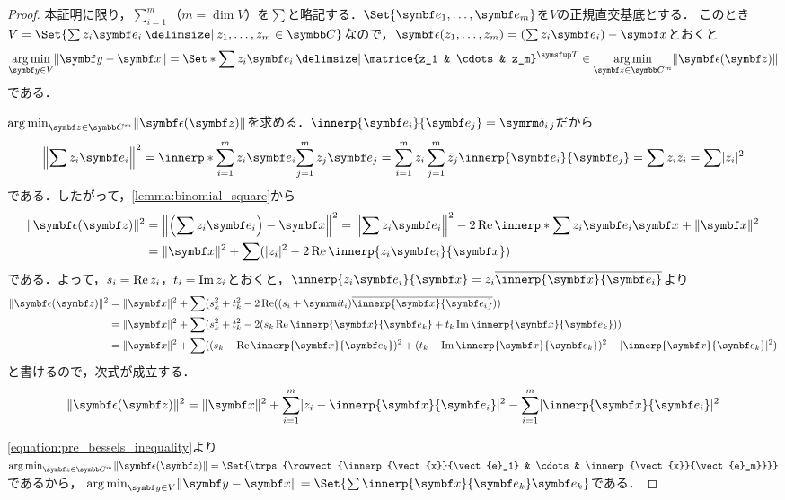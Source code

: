 \documentclass[../../main]{subfiles}
\begin{document}
\begin{proof}
  本証明に限り，\(\sum_{i=1}^m\)（\(m=\dim V\)）を\(\sum\)と略記する．\(\Set{\vect{e}_1,\dots,\vect{e}_m}\)を\(V\)の正規直交基底とする．
  このとき\(V=\Set{\sum z_i\vect{e}_i\given z_1,\dots,z_m\in\numset{C}}\)なので，\(\vect{\epsilon}(z_1,\dots,z_m)=(\sum z_i\vect{e}_i)-\vect{x}\)とおくと
  \[
    \argmin_{\vect{y}\in V}\vnorm{\vect{y}-\vect{x}} = \Set*{\sum z_i\vect{e}_i\given\trps{\matrice{z_1 & \cdots & z_m}}\in\argmin_{\vect{z}\in\numset{C}^m}\vnorm{\vect{\epsilon}(\vect{z})}}
  \]
  である．

  \(\argmin_{\vect{z}\in\numset{C}^m}\vnorm{\vect{\epsilon}(\vect{z})}\)を求める．\(\innerp{\vect{e}_i}{\vect{e}_j}=\kdelta{i}{j}\)だから
  \[
    \vnorm*{\sum z_i\vect{e}_i}^2 = \innerp*{\sum_{i=1}^mz_i\vect{e}_i}{\sum_{j=1}^mz_j\vect{e}_j}
    = \sum_{i=1}^mz_i\sum_{j=1}^m\conj{z}_j\innerp{\vect{e}_i}{\vect{e}_j}
    = \sum z_i\conj{z}_i
    = \sum\abs{z_i}^2
  \]
  である．したがって，\cref{lemma:binomial_square}から
  \begin{align*}
    \vnorm{\vect{\epsilon}(\vect{z})}^2 &= \vnorm*{\pqty*{\sum z_i\vect{e}_i}-\vect{x}}^2
    = \vnorm*{\sum z_i\vect{e}_i}^2-2\rpart\innerp*{\sum z_i\vect{e}_i}{\vect{x}}+\vnorm{\vect{x}}^2 \\
    &= \vnorm{\vect{x}}^2+\sum(\abs{z_i}^2-2\rpart\innerp{z_i\vect{e}_i}{\vect{x}})
  \end{align*}
  である．よって，\(s_i=\operatorname{Re} z_i\)，\(t_i=\operatorname{Im} z_i\)とおくと，\(\innerp{z_i\vect{e}_i}{\vect{x}}=z_i\conj*{\innerp{\vect{x}}{\vect{e}_i}}\)より
  \begin{align*}
    \vnorm{\vect{\epsilon}(\vect{z})}^2 &= \vnorm{\vect{x}}^2+\sum(s_k^2+t_k^2-2\rpart((s_i+\iuni t_i)\conj*{\innerp{\vect{x}}{\vect{e}_i}})) \\
    &= \vnorm{\vect{x}}^2+\sum(s_k^2+t_k^2-2(s_k\rpart\innerp{\vect{x}}{\vect{e}_k}+t_k\ipart\innerp{\vect{x}}{\vect{e}_k})) \\
    &= \vnorm{\vect{x}}^2+\sum((s_k-\rpart\innerp{\vect{x}}{\vect{e}_k})^2+(t_k-\ipart\innerp{\vect{x}}{\vect{e}_k})^2-\abs{\innerp{\vect{x}}{\vect{e}_k}}^2)
  \end{align*}
  と書けるので，次式が成立する．
  \begin{equation}
    \label{equation:pre_bessels_inequality}
    \vnorm{\vect{\epsilon}(\vect{z})}^2 = \vnorm{\vect{x}}^2+\sum_{i=1}^m\abs{z_i-\innerp{\vect{x}}{\vect{e}_i}}^2-\sum_{i=1}^m\abs{\innerp{\vect{x}}{\vect{e}_i}}^2
  \end{equation}

  \cref{equation:pre_bessels_inequality}より\(\argmin_{\vect{z}\in\numset{C}^m}\vnorm{\vect{\epsilon}(\vect{z})}=\Set{\trps{\rowvect{\innerp{\vect{x}}{\vect{e}_1} & \cdots & \innerp{\vect{x}}{\vect{e}_m}}}}\)であるから，
  \(\argmin_{\vect{y}\in V}\vnorm{\vect{y}-\vect{x}}=\Set{\sum\innerp{\vect{x}}{\vect{e}_k}\vect{e}_k}\)である．
\end{proof}
\end{document}
